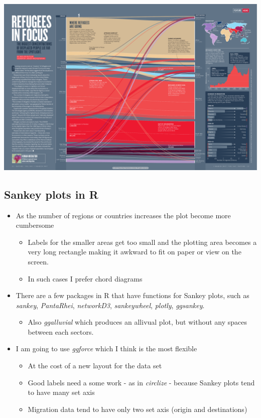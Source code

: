 \documentclass[
]{book}
\providecommand{\tightlist}{%
  \setlength{\itemsep}{0pt}\setlength{\parskip}{0pt}}
\begin{document}
\includegraphics{img/Migration_Graphic.pdf}

\hypertarget{sankey-plots-in-r}{%
\subsection{Sankey plots in R}\label{sankey-plots-in-r}}

\begin{itemize}
\tightlist
\item
  As the number of regions or countries increases the plot become more cumbersome

  \begin{itemize}
  \tightlist
  \item
    Labels for the smaller areas get too small and the plotting area becomes a very long rectangle making it awkward to fit on paper or view on the screen.
  \item
    In such cases I prefer chord diagrams
  \end{itemize}
\item
  There are a few packages in R that have functions for Sankey plots, such as \emph{sankey}, \emph{PantaRhei}, \emph{networkD3}, \emph{sankeywheel}, \emph{plotly}, \emph{ggsankey}.

  \begin{itemize}
  \tightlist
  \item
    Also \emph{ggalluvial} which produces an allivual plot, but without any spaces between each sectors.
  \end{itemize}
\item
  I am going to use \emph{ggforce} which I think is the most flexible

  \begin{itemize}
  \tightlist
  \item
    At the cost of a new layout for the data set
  \item
    Good labels need a some work - as in \emph{circlize} -
    because Sankey plots tend to have many set axis
  \item
    Migration data tend to have only two set axis (origin and destinations)
  \end{itemize}
\end{itemize}
\end{document}
